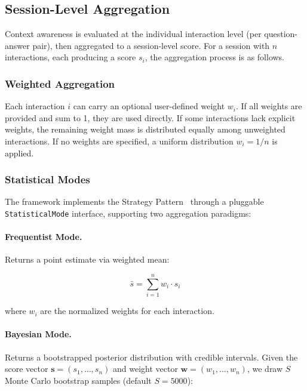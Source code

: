 \documentclass[11pt,a4paper]{article}
\begin{document}
\subsection{Session-Level Aggregation}

Context awareness is evaluated at the individual interaction level (per question-answer pair), then aggregated to a session-level score. For a session with $n$ interactions, each producing a score $s_i$, the aggregation process is as follows.

\subsubsection{Weighted Aggregation}

Each interaction $i$ can carry an optional user-defined weight $w_i$. If all weights are provided and sum to 1, they are used directly. If some interactions lack explicit weights, the remaining weight mass is distributed equally among unweighted interactions. If no weights are specified, a uniform distribution $w_i = 1/n$ is applied.

\subsubsection{Statistical Modes}

The framework implements the Strategy Pattern~\cite{gamma1994design} through a pluggable \texttt{StatisticalMode} interface, supporting two aggregation paradigms:

\paragraph{Frequentist Mode.} Returns a point estimate via weighted mean:

\begin{equation}
    \bar{s} = \sum_{i=1}^{n} w_i \cdot s_i
\end{equation}

where $w_i$ are the normalized weights for each interaction.

\paragraph{Bayesian Mode.} Returns a bootstrapped posterior distribution with credible intervals. Given the score vector $\mathbf{s} = (s_1, \ldots, s_n)$ and weight vector $\mathbf{w} = (w_1, \ldots, w_n)$, we draw $S$ Monte Carlo bootstrap samples (default $S = 5000$):
\end{document}
